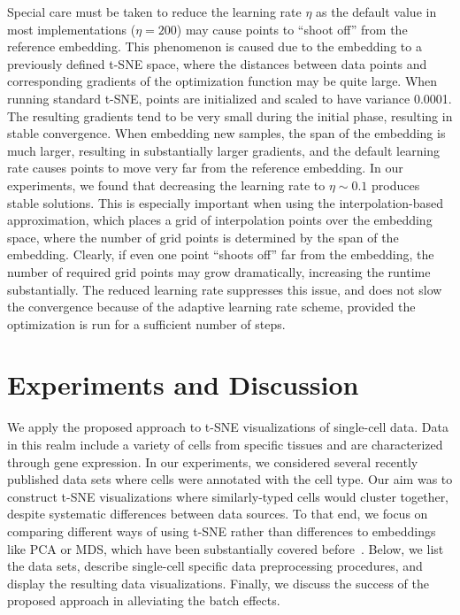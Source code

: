 \documentclass[runningheads]{llncs}
\begin{document}
Special care must be taken to reduce the learning rate $\eta$ as the default
value in most implementations ($\eta = 200$) may cause points to ``shoot off''
from the reference embedding. This phenomenon is caused due to the embedding to
a previously defined t-SNE space, where the distances between data points and
corresponding gradients of the optimization function may be quite large. When
running standard t-SNE, points are initialized and scaled to have variance
0.0001. The resulting gradients tend to be very small during the initial phase,
resulting in stable convergence. When embedding new samples, the span of the
embedding is much larger, resulting in substantially larger gradients, and the
default learning rate causes points to move very far from the reference
embedding. In our experiments, we found that decreasing the learning rate to
$\eta \sim 0.1$ produces stable solutions. This is especially important when
using the interpolation-based approximation, which places a grid of
interpolation points over the embedding space, where the number of grid points
is determined by the span of the embedding. Clearly, if even one point ``shoots
off'' far from the embedding, the number of required grid points may grow
dramatically, increasing the runtime substantially. The reduced learning rate
suppresses this issue, and does not slow the convergence because of the
adaptive learning rate scheme, provided the optimization is run for a
sufficient number of steps.

\section{Experiments and Discussion}

We apply the proposed approach to t-SNE visualizations of single-cell data.
Data in this realm include a variety of cells from specific tissues and are
characterized through gene expression.  In our experiments, we considered
several recently published data sets where cells were annotated with the cell
type. Our aim was to construct t-SNE visualizations where similarly-typed cells
would cluster together, despite systematic differences between data sources. To
that end, we focus on comparing different ways of using t-SNE rather than
differences to embeddings like PCA or MDS, which have been substantially
covered before~\cite{tsne,umap_single_cell}.  Below, we list the data sets,
describe single-cell specific data preprocessing procedures, and display the
resulting data visualizations. Finally, we discuss the success of the proposed
approach in alleviating the batch effects.
\end{document}
